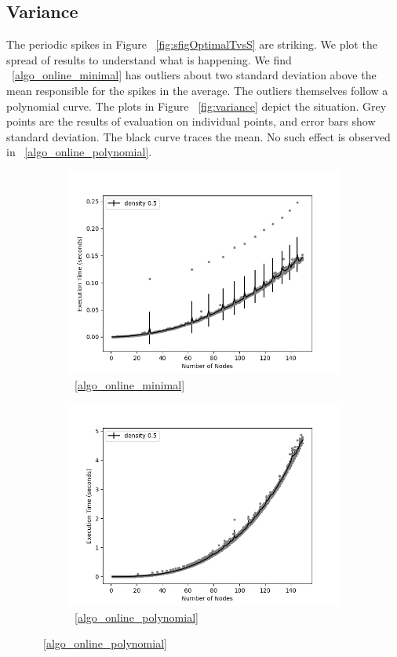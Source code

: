 \documentclass[sigplan,review,anonymous]{acmart}
\begin{document}
{\subsection{Variance}
The periodic spikes in Figure ~\ref{fig:sfigOptimalTvsS} are striking. 
We plot the spread of results to understand what is happening.
We find ~\ref{algo_online_minimal} has outliers about two standard deviation above the mean responsible for the spikes in the average.
The outliers themselves follow a polynomial curve.
The plots in Figure ~\ref{fig:variance} depict the situation.
Grey points are the results of evaluation on individual points, and error bars show standard deviation. 
The black curve traces the mean.
No such effect is observed in ~\ref{algo_online_polynomial}.
\begin{figure}
    \begin{subfigure}{0.5\linewidth}
      \includegraphics[width=.8\linewidth]{variance_10_OptimalSet.png}
      \caption{~\ref{algo_online_minimal}}
      \label{fig:sfigOptimalSpread}
    \end{subfigure}

    \begin{subfigure}{0.5\linewidth}
      \includegraphics[width=.8\linewidth]{variance_10_Polynomial.png}
      \caption{~\ref{algo_online_polynomial}}
      \label{fig:sfigPolynomialSpread}
    \end{subfigure}
    

\end{figure}}
\end{document}
